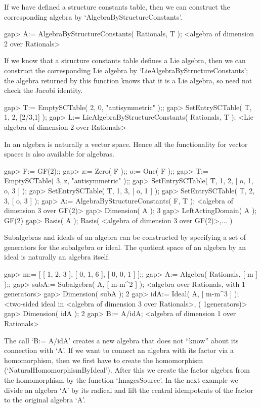 If we have defined a structure constants table, then we can construct
the corresponding algebra by `AlgebraByStructureConstants'.

\beginexample
gap> A:= AlgebraByStructureConstants( Rationals, T );
<algebra of dimension 2 over Rationals>
\endexample

If we know that a structure constants table defines a Lie algebra,
then we can construct the corresponding Lie algebra by
`LieAlgebraByStructureConstants';
the algebra returned by this function knows that it is a Lie algebra,
so {\GAP} need not check the Jacobi identity.

\beginexample
gap> T:= EmptySCTable( 2, 0, "antisymmetric" );;
gap> SetEntrySCTable( T, 1, 2, [2/3,1] );
gap> L:= LieAlgebraByStructureConstants( Rationals, T );
<Lie algebra of dimension 2 over Rationals>
\endexample

In {\GAP} an algebra is naturally a vector space. Hence all the functionality
for vector spaces is also available for algebras.

\beginexample
gap> F:= GF(2);;
gap> z:= Zero( F );;  o:= One( F );;
gap> T:= EmptySCTable( 3, z, "antisymmetric" );;
gap> SetEntrySCTable( T, 1, 2, [ o, 1, o, 3 ] );
gap> SetEntrySCTable( T, 1, 3, [ o, 1 ] );
gap> SetEntrySCTable( T, 2, 3, [ o, 3 ] );
gap> A:= AlgebraByStructureConstants( F, T );
<algebra of dimension 3 over GF(2)>
gap> Dimension( A );
3
gap> LeftActingDomain( A );
GF(2)
gap> Basis( A );
Basis( <algebra of dimension 3 over GF(2)>,... )
\endexample

Subalgebras and ideals of an algebra can be constructed by specifying
a set of generators for the subalgebra or ideal. The quotient space
of an algebra by an ideal is naturally an algebra itself.

\beginexample
gap> m:= [ [ 1, 2, 3 ], [ 0, 1, 6 ], [ 0, 0, 1 ] ];;
gap> A:= Algebra( Rationals, [ m ] );;
gap> subA:= Subalgebra( A, [ m-m^2 ] );   
<algebra over Rationals, with 1 generators>
gap> Dimension( subA );
2
gap> idA:= Ideal( A, [ m-m^3 ] );
<two-sided ideal in <algebra of dimension 3 over Rationals>, (
1generators)>
gap> Dimension( idA ); 
2
gap> B:= A/idA;
<algebra of dimension 1 over Rationals>
\endexample

The call `B:= A/idA' creates a new algebra that does not ``know'' about
its connection with `A'. If we want to connect an algebra with its factor
via a homomorphism, then we first have to create the homomorphism
(`NaturalHomomorphismByIdeal'). After this we create the factor algebra 
from the homomorphism by the function `ImagesSource'. In the next example
we divide an algebra `A' by its radical and lift the central idempotents
of the factor to the original algebra `A'.

